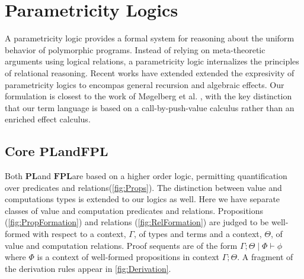 \documentclass[acmsmall]{acmart}
\newcommand{\pl}{$\mathbf{PL}$}
\newcommand{\fpl}{$\mathbf{FPL}$}
\begin{document}
\section{Parametricity Logics}\label{sec:Logics}
A parametricity logic\cite{APL} provides a formal system for reasoning about the uniform behavior of polymorphic programs. Instead of relying on meta-theoretic arguments using logical relations, a parametricity logic internalizes the principles of relational reasoning. Recent works have extended extended the expresivity of parametricity logics to encompas general recursion\cite{LAPL} and algebraic effects\cite{PE}. Our formulation is closest to the work of Møgelberg et al. \cite{PE}, with the key distinction that our term language is based on a call-by-push-value calculus rather than an enriched effect calculus\cite{EEC}.


\subsection{Core \pl\;and\;\fpl}
Both \pl\;and \fpl\;are based on a higher order logic, permitting quantification over predicates and relations(\cref{fig:Props}). The distinction between value and computations types is extended to our logics as well. Here we have separate classes of value and computation predicates and relations. Propositions (\cref{fig:PropFormation}) and relations (\cref{fig:RelFormation}) are judged to be well-formed with respect to a context, $\Gamma$, of types and terms and a context, $\Theta$, of value and computation relations.  Proof sequents are of the form $\Gamma ; \Theta \;|\; \Phi \vdash \phi$ where $\Phi$ is a context of well-formed propositions in context $\Gamma; \Theta$. A fragment of the derivation rules appear in \cref{fig:Derivation}. 
\end{document}
